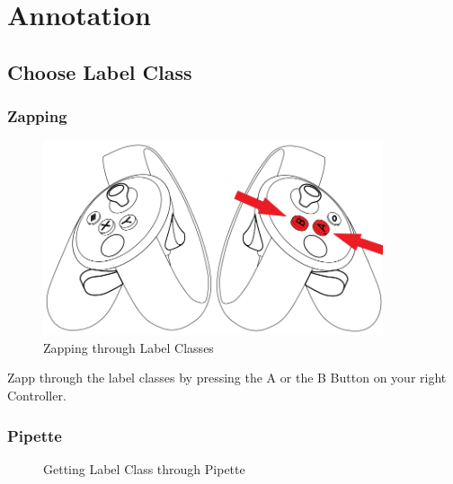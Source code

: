 \documentclass[notitlepage]{article}
\begin{document}

\bigskip
\bigskip
\bigskip
\section{Annotation}

\subsection{Choose Label Class}

\subsubsection{Zapping}

\begin{figure}[H]
   \centering
	\includegraphics[width=10cm]{Controllers_A&B}%
    \caption{Zapping through Label Classes}\label{fig:Controllers_A&B}%
\end{figure}

\qquad
Zapp through the label classes by pressing the A or the B Button on your right Controller.

\subsubsection{Pipette}

\begin{figure}[H]
   \centering
    \quad
    \caption{Getting Label Class through Pipette}\label{fig:UI-Interaction}%
\end{figure}
\end{document}

